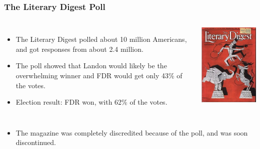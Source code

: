 \begin{frame}
\frametitle{The Literary Digest Poll}

\begin{columns}


\begin{itemize}

\item The Literary Digest polled about 10 million Americans, and got responses from about 2.4 million.

\item The poll showed that Landon would likely be the overwhelming winner and FDR would get only 43\% of the votes.

\item Election result:  FDR won, with 62\% of the votes.

\end{itemize}


\includegraphics[width= \textwidth]{1-3_data_collection_principles/figures/literaryDigest}

\end{columns}

\begin{itemize}

\item The magazine was completely discredited because of the poll, and was soon discontinued.

\end{itemize}

\end{frame}

